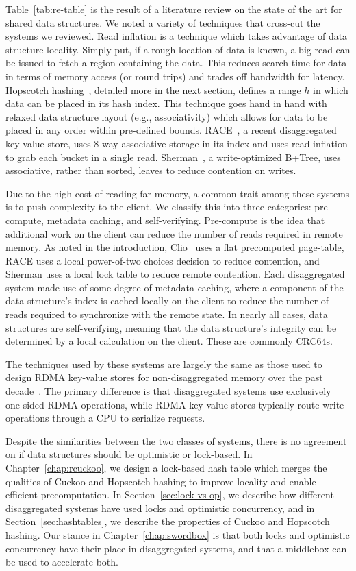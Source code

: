 \documentclass[12pt]{ucsddissertation}
\begin{document}
Table~\ref{tab:re-table} is the result of a literature review on the state of the art for shared
data structures. We noted a variety of techniques that cross-cut the systems we reviewed. Read
inflation is a technique which takes advantage of data structure locality. Simply put, if a rough
location of data is known, a big read can be issued to fetch a region containing the data. This
reduces search time for data in terms of memory access (or round trips) and trades off bandwidth for
latency. Hopscotch hashing~\cite{hopscotch}, detailed more in the next section, defines a range $h$
in which data can be placed in its hash index. This technique goes hand in hand with relaxed data
structure layout (e.g., associativity) which allows for data to be placed in any order within
pre-defined bounds. RACE~\cite{race}, a recent disaggregated key-value store, uses 8-way associative
storage in its index and uses read inflation to grab each bucket in a single read.
Sherman~\cite{sherman}, a write-optimized B+Tree, uses associative, rather than sorted, leaves to
reduce contention on writes.

Due to the high cost of reading far memory, a common trait among these systems is to push complexity
to the client. We classify this into three categories: pre-compute, metadata caching, and
self-verifying. Pre-compute is the idea that additional work on the client can reduce the number of
reads required in remote memory. As noted in the introduction, Clio~\cite{clio} uses a flat
precomputed page-table, RACE uses a local power-of-two choices decision to reduce contention, and
Sherman uses a local lock table to reduce remote contention. Each disaggregated system made use of
some degree of metadata caching, where a component of the data structure's index is cached locally
on the client to reduce the number of reads required to synchronize with the remote state. In nearly
all cases, data structures are self-verifying, meaning that the data structure's integrity can be
determined by a local calculation on the client. These are commonly CRC64s.

The techniques used by these systems are largely the same as those used to design RDMA key-value
stores for non-disaggregated memory over the past decade~\cite{pilaf,cell,herd,farm}. The primary
difference is that disaggregated systems use exclusively one-sided RDMA operations, while RDMA
key-value stores typically route write operations through a CPU to serialize requests.

Despite the similarities between the two classes of systems, there is no agreement on if data
structures should be optimistic or lock-based. In Chapter~\ref{chap:rcuckoo}, we design a lock-based
hash table which merges the qualities of Cuckoo and Hopscotch hashing to improve locality and enable
efficient precomputation. In Section~\ref{sec:lock-vs-op}, we describe how different disaggregated
systems have used locks and optimistic concurrency, and in Section~\ref{sec:hashtables}, we describe
the properties of Cuckoo and Hopscotch hashing. Our stance in Chapter~\ref{chap:swordbox} is that
both locks and optimistic concurrency have their place in disaggregated systems, and that a
middlebox can be used to accelerate both.
\end{document}

